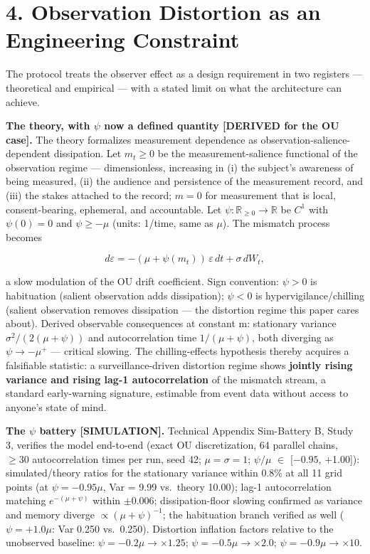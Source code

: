 \documentclass[11pt,twocolumn]{article}
\begin{document}
\FloatBarrier
\section*{4. Observation Distortion as an Engineering
Constraint}

The protocol treats the observer effect as a design requirement in two
registers --- theoretical and empirical --- with a stated limit on what the
architecture can achieve.

\textbf{The theory, with \(\psi\) now a defined quantity {[}DERIVED for
the OU case{]}.} The theory formalizes measurement dependence as
observation-salience-dependent dissipation. Let \(m_t \geq 0\) be the
measurement-salience functional of the observation regime ---
dimensionless, increasing in (i) the subject's awareness of being
measured, (ii) the audience and persistence of the measurement record,
and (iii) the stakes attached to the record; \(m = 0\) for measurement
that is local, consent-bearing, ephemeral, and accountable. Let
\(\psi : \mathbb{R}_{\geq 0} \to \mathbb{R}\) be \(C^1\) with
\(\psi(0) = 0\) and \(\psi \geq -\mu\) (units: 1/time, same as \(\mu\)).
The mismatch process becomes

\begin{equation} d\varepsilon = -(\mu + \psi(m_t))\,\varepsilon\, dt + \sigma\, dW_t, \label{eq:ou} \end{equation}

a slow modulation of the OU drift coefficient. Sign convention:
\(\psi > 0\) is habituation (salient observation adds dissipation);
\(\psi < 0\) is hypervigilance/chilling (salient observation removes
dissipation --- the distortion regime this paper cares about). Derived
observable consequences at constant m: stationary variance
\(\sigma^2/(2(\mu + \psi))\) and autocorrelation time
\(1/(\mu + \psi)\), both diverging as \(\psi \to -\mu^{+}\) --- critical
slowing. The chilling-effects hypothesis thereby acquires a falsifiable
statistic: a surveillance-driven distortion regime shows \textbf{jointly
rising variance and rising lag-1 autocorrelation} of the mismatch
stream, a standard early-warning signature, estimable from event data
without access to anyone's state of mind.

\textbf{The \(\psi\) battery {[}SIMULATION{]}.} Technical Appendix
Sim-Battery B, Study 3, verifies the model end-to-end (exact OU
discretization, 64 parallel chains, \(\geq 30\) autocorrelation times
per run, seed 42; \(\mu = \sigma = 1\); \(\psi /\mu\) \(\in\)
{[}\(-0.95\), +1.00{]}): simulated/theory ratios for the stationary
variance within 0.8\% at all 11 grid points (at \(\psi = -0.95\mu\), Var
= 9.99 vs.~theory 10.00); lag-1 autocorrelation matching
\(e^{-(\mu+\psi)}\) within \(\pm 0.006\); dissipation-floor slowing
confirmed as variance and memory diverge \(\propto (\mu+\psi)^{-1}\);
the habituation branch verified as well (\(\psi = +1.0\mu\): Var 0.250
vs.~0.250). Distortion inflation factors relative to the unobserved
baseline: \(\psi = -0.2\mu \to \times 1.25\);
\(\psi = -0.5\mu \to \times 2.0\); \(\psi = -0.9\mu \to \times 10\).
\end{document}
